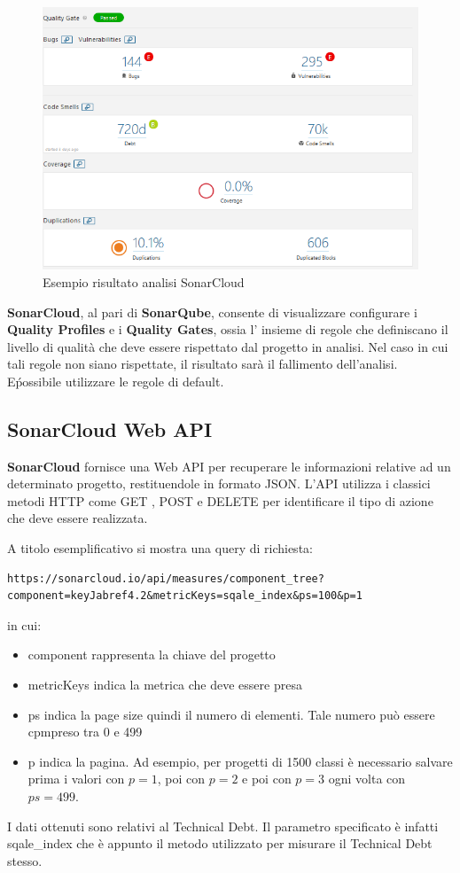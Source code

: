 \begin{figure}[htbp]
	\centering
	\includegraphics[scale=0.5, trim = 0cm 0cm 0cm 0cm, clip=true]{figSonarCloud/analisi.PNG}
	\caption{Esempio risultato analisi SonarCloud}
	\label{fig:analisi}
\end{figure}

\textbf{SonarCloud}, al pari di \textbf{SonarQube}, consente di visualizzare configurare i \textbf{Quality Profiles} e i \textbf{Quality Gates}, ossia l' insieme di regole che definiscano il livello di qualità che deve essere rispettato dal progetto in analisi. Nel caso in cui tali regole non siano rispettate, il risultato sarà il fallimento dell'analisi. E\' possibile utilizzare le regole di default. 

\subsection{SonarCloud Web API}
\textbf{SonarCloud} fornisce una Web API per recuperare le informazioni relative ad un determinato progetto, restituendole in formato JSON. L'API utilizza i classici metodi HTTP come GET , POST e DELETE per identificare il tipo di azione che deve essere realizzata. 

A titolo esemplificativo si mostra una query di richiesta:
\begin{verbatim}
https://sonarcloud.io/api/measures/component_tree?component=keyJabref4.2&metricKeys=sqale_index&ps=100&p=1
\end{verbatim}

in cui:
\begin{itemize}
	\item component rappresenta la chiave del progetto
	\item metricKeys indica la metrica che deve essere presa
	\item ps indica la page size quindi il numero di elementi. Tale numero può essere cpmpreso tra 0 e 499
	\item p indica la pagina. Ad esempio, per progetti di 1500 classi è necessario salvare prima i valori con $p=1$, poi con $p=2$ e poi con $p=3$ ogni volta con $ps=499$.
\end{itemize}

I dati ottenuti sono relativi al Technical Debt. Il parametro specificato è infatti sqale\_index che è appunto il metodo utilizzato per misurare il Technical Debt stesso. 